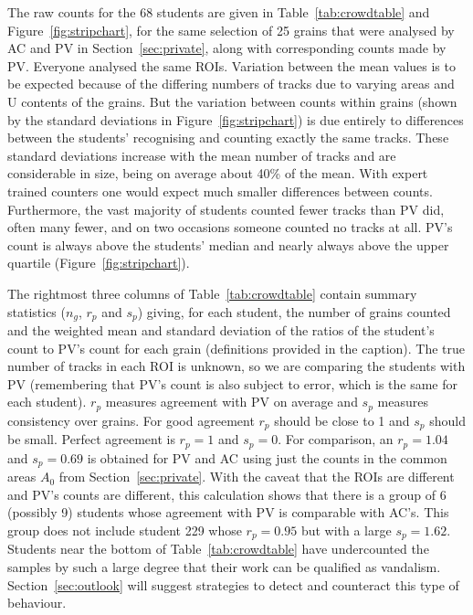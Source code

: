 \documentclass{article}
\begin{document}
The raw counts for the 68 students are given in
Table~\ref{tab:crowdtable} and Figure~\ref{fig:stripchart}, for the
same selection of 25 grains that were analysed by AC and PV in
Section~\ref{sec:private}, along with corresponding counts made by
PV. Everyone analysed the same ROIs. Variation between the mean values
is to be expected because of the differing numbers of tracks due to
varying areas and U contents of the grains. But the variation between
counts within grains (shown by the standard deviations in
Figure~\ref{fig:stripchart}) is due entirely to differences between
the students' recognising and counting exactly the same tracks. These
standard deviations increase with the mean number of tracks and are
considerable in size, being on average about 40\% of the mean. With
expert trained counters one would expect much smaller differences
between counts.  Furthermore, the vast majority of students counted
fewer tracks than PV did, often many fewer, and on two occasions
someone counted no tracks at all. PV's count is always above the
students' median and nearly always above the upper quartile
(Figure~\ref{fig:stripchart}).\medskip

The rightmost three columns of Table~\ref{tab:crowdtable} contain
summary statistics ($n_g$, $r_p$ and $s_p$) giving, for each student,
the number of grains counted and the weighted mean and standard
deviation of the ratios of the student's count to PV's count for each
grain (definitions provided in the caption). The true number of tracks
in each ROI is unknown, so we are comparing the students with PV
(remembering that PV's count is also subject to error, which is the
same for each student). $r_p$ measures agreement with PV on average
and $s_p$ measures consistency over grains. For good agreement $r_p$
should be close to 1 and $s_p$ should be small.  Perfect agreement is
$r_p = 1$ and $s_p = 0$. For comparison, an $r_p = 1.04$ and $s_p =
0.69$ is obtained for PV and AC using just the counts in the common
areas $A_0$ from Section~\ref{sec:private}. With the caveat that the
ROIs are different and PV's counts are different, this calculation
shows that there is a group of 6 (possibly 9) students whose agreement
with PV is comparable with AC's. This group does not include student
229 whose $r_p = 0.95$ but with a large $s_p = 1.62$. Students near
the bottom of Table~\ref{tab:crowdtable} have undercounted the samples
by such a large degree that their work can be qualified as
vandalism. Section~\ref{sec:outlook} will suggest strategies to detect
and counteract this type of behaviour.\medskip
\end{document}
